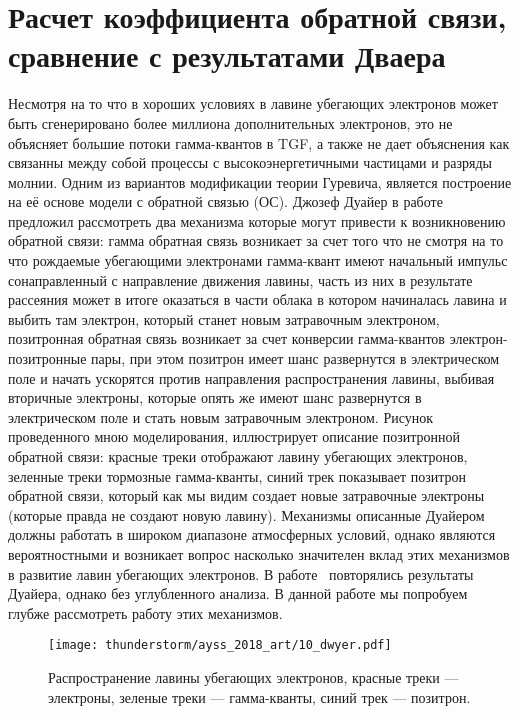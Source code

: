 \section{Расчет коэффициента обратной связи, сравнение с результатами Дваера}\label{sec:thunderstorm/rdfm}

Несмотря на то что в хороших условиях в лавине убегающих электронов может быть сгенерировано более миллиона дополнительных электронов, это не объясняет большие потоки гамма-квантов в TGF, а также не дает объяснения как связанны между собой процессы с высокоэнергетичными частицами и разряды молнии. Одним из вариантов модификации теории Гуревича, является построение на её основе модели с обратной связью (ОС). Джозеф Дуайер в работе~\cite{dwyer2003fundamental} предложил рассмотреть два механизма которые могут привести к возникновению обратной связи: гамма обратная связь возникает за счет того что не смотря на то что рождаемые убегающими электронами гамма-квант имеют начальный импульс сонаправленный с направление движения лавины, часть из них в результате рассеяния может в итоге оказаться в части облака в котором начиналась лавина и выбить там электрон, который станет новым затравочным электроном, позитронная обратная связь возникает за счет конверсии гамма-квантов электрон-позитронные пары, при этом позитрон имеет шанс развернутся в электрическом поле и начать ускорятся против направления распространения лавины, выбивая вторичные электроны, которые опять же имеют шанс развернутся в электрическом поле и стать новым затравочным электроном. Рисунок проведенного мною моделирования, иллюстрирует описание позитронной обратной связи: красные треки отображают лавину убегающих электронов, зеленные треки тормозные гамма-кванты, синий трек показывает позитрон обратной связи, который как мы видим создает новые затравочные электроны (которые правда не создают новую лавину). Механизмы описанные Дуайером должны работать в широком диапазоне атмосферных условий, однако являются вероятностными и возникает вопрос насколько значителен вклад этих механизмов в развитие лавин убегающих электронов. В работе~\cite{skeltved2014} повторялись результаты Дуайера, однако без углубленного анализа. В данной работе мы попробуем глубже рассмотреть работу этих механизмов.

\begin{figure}[ph!]
    \begin{center}
        \texttt{[image: thunderstorm/ayss\_2018\_art/10\_dwyer.pdf]}
        \caption{Распространение лавины убегающих электронов, красные треки --- электроны, зеленые треки --- гамма-кванты, синий трек --- позитрон.}
    \end{center}
    \label{fig:storm:dwyer}
\end{figure}

